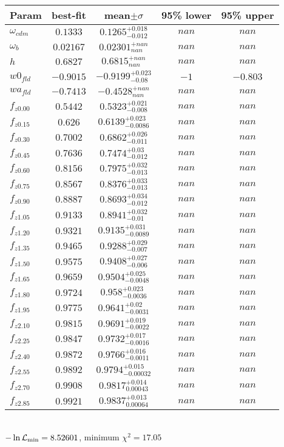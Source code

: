 \begin{tabular}{|l|c|c|c|c|} 
 \hline 
Param & best-fit & mean$\pm\sigma$ & 95\% lower & 95\% upper \\ \hline 
$\omega_{cdm }$ &$0.1333$ & $0.1265_{-0.012}^{+0.018}$ & $nan$ & $nan$ \\ 
$\omega_{b }$ &$0.02167$ & $0.02301_{nan}^{+nan}$ & $nan$ & $nan$ \\ 
$h$ &$0.6827$ & $0.6815_{nan}^{+nan}$ & $nan$ & $nan$ \\ 
$w0_{fld }$ &$-0.9015$ & $-0.9199_{-0.08}^{+0.023}$ & $-1$ & $-0.803$ \\ 
$wa_{fld }$ &$-0.7413$ & $-0.4528_{nan}^{+nan}$ & $nan$ & $nan$ \\ 
$f_{z0.00 }$ &$0.5442$ & $0.5323_{-0.008}^{+0.021}$ & $nan$ & $nan$ \\ 
$f_{z0.15 }$ &$0.626$ & $0.6139_{-0.0086}^{+0.023}$ & $nan$ & $nan$ \\ 
$f_{z0.30 }$ &$0.7002$ & $0.6862_{-0.011}^{+0.026}$ & $nan$ & $nan$ \\ 
$f_{z0.45 }$ &$0.7636$ & $0.7474_{-0.012}^{+0.03}$ & $nan$ & $nan$ \\ 
$f_{z0.60 }$ &$0.8156$ & $0.7975_{-0.013}^{+0.032}$ & $nan$ & $nan$ \\ 
$f_{z0.75 }$ &$0.8567$ & $0.8376_{-0.013}^{+0.033}$ & $nan$ & $nan$ \\ 
$f_{z0.90 }$ &$0.8887$ & $0.8693_{-0.012}^{+0.034}$ & $nan$ & $nan$ \\ 
$f_{z1.05 }$ &$0.9133$ & $0.8941_{-0.01}^{+0.032}$ & $nan$ & $nan$ \\ 
$f_{z1.20 }$ &$0.9321$ & $0.9135_{-0.0089}^{+0.031}$ & $nan$ & $nan$ \\ 
$f_{z1.35 }$ &$0.9465$ & $0.9288_{-0.007}^{+0.029}$ & $nan$ & $nan$ \\ 
$f_{z1.50 }$ &$0.9575$ & $0.9408_{-0.006}^{+0.027}$ & $nan$ & $nan$ \\ 
$f_{z1.65 }$ &$0.9659$ & $0.9504_{-0.0048}^{+0.025}$ & $nan$ & $nan$ \\ 
$f_{z1.80 }$ &$0.9724$ & $0.958_{-0.0036}^{+0.023}$ & $nan$ & $nan$ \\ 
$f_{z1.95 }$ &$0.9775$ & $0.9641_{-0.0031}^{+0.02}$ & $nan$ & $nan$ \\ 
$f_{z2.10 }$ &$0.9815$ & $0.9691_{-0.0022}^{+0.019}$ & $nan$ & $nan$ \\ 
$f_{z2.25 }$ &$0.9847$ & $0.9732_{-0.0016}^{+0.017}$ & $nan$ & $nan$ \\ 
$f_{z2.40 }$ &$0.9872$ & $0.9766_{-0.0011}^{+0.016}$ & $nan$ & $nan$ \\ 
$f_{z2.55 }$ &$0.9892$ & $0.9794_{-0.00032}^{+0.015}$ & $nan$ & $nan$ \\ 
$f_{z2.70 }$ &$0.9908$ & $0.9817_{0.00043}^{+0.014}$ & $nan$ & $nan$ \\ 
$f_{z2.85 }$ &$0.9921$ & $0.9837_{0.00064}^{+0.013}$ & $nan$ & $nan$ \\ 
\hline 
 \end{tabular} \\ 
$-\ln{\cal L}_\mathrm{min} =8.52601$, minimum $\chi^2=17.05$ \\ 

